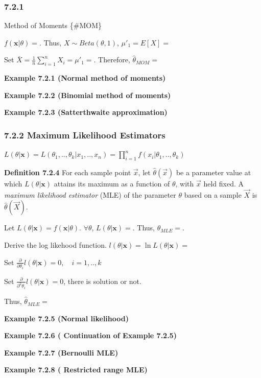 \documentclass[10pt,twocolumn,portrait]{article}
\begin{document}
\hypertarget{section-2}{%
\subsubsection{7.2.1}\label{section-2}}

Method of Moments \{\#MOM\}

\(f(\mathbf{x}|\theta)=\). Thus, \(X\sim Beta(\theta,1)\),
\(\mu'_1=E[X]=\)

Set \(\bar X=\frac1n\sum_{i=1}^nX_i=\mu'_1=\). Therefore,
\(\hat\theta_{MOM}=\)

\textbf{Example 7.2.1 (Normal method of moments)}

\textbf{Example 7.2.2 (Binomial method of moments)}

\textbf{Example 7.2.3 (Satterthwaite approximation)}

\hypertarget{MLE}{%
\subsubsection{7.2.2 Maximum Likelihood Estimators}\label{MLE}}

\(L(\theta|\mathbf{x})=L(\theta_1,..,\theta_k|x_1,..,x_n)=\prod_{i=1}^n f(x_i|\theta_1,..,\theta_k)\)

\textbf{Definition 7.2.4} For each sample point \(\vec x\), let
\(\hat\theta(\vec x)\) be a parameter value at which
\(L(\theta|\mathbf{x})\) attains its maximum as a function of
\(\theta\), with \(\vec x\) held fixed. A \emph{maximum likelihood
estimator} (MLE) of the parameter \(\theta\) based on a sample
\(\vec X\) is \(\hat\theta(\vec X)\).

Let \(L(\theta|\mathbf{x})=f(\mathbf{x}|\theta)\). \(\forall\theta\),
\(L(\theta|\mathbf{x})=\). Thus, \(\theta_{MLE}=\).

Derive the log likehood function.
\(l(\theta|\mathbf{x})=\ln L(\theta|\mathbf{x})=\)

Set
\(\frac{\partial}{\partial\theta_i}l(\theta|\mathbf{x})=0,\quad i=1,..,k\)

Set \(\frac{\partial}{\partial^2\theta_i}l(\theta|\mathbf{x})=0\), there
is solution or not.

Thus, \(\hat\theta_{MLE}=\)

\textbf{Example 7.2.5 (Normal likelihood)}

\textbf{Example 7.2.6 ( Continuation of Example 7.2.5)}

\textbf{Example 7.2.7 (Bernoulli MLE)}

\textbf{Example 7.2.8 ( Restricted range MLE)}
\end{document}
